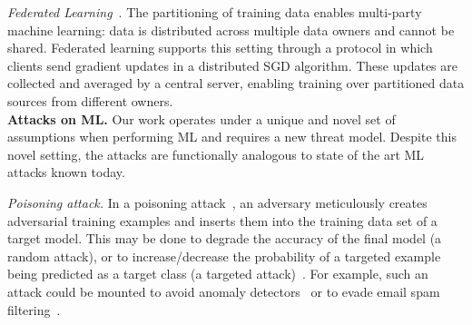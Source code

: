 
\textit{Federated Learning}~\cite{McMahan:2017}. The partitioning of
training data enables multi-party machine learning: data is
distributed across multiple data owners and cannot be shared. Federated
learning supports this setting through a protocol in which clients send
gradient updates in a distributed SGD algorithm. These updates are
collected and averaged by a central server, enabling training over
partitioned data sources from different owners. \\

\noindent \textbf{Attacks on ML.} 
%
Our work operates under a unique and novel set of assumptions when
performing ML and requires a new threat model. Despite this novel
setting, the attacks are functionally analogous to state of the art ML
attacks known today. 

\emph{Poisoning attack.}  In a poisoning attack~\cite{Biggio:2012,
Mozaffari-Kermani:2015}, an adversary meticulously creates adversarial
training examples and inserts them into the training data set of a 
target model. This may be done to degrade the accuracy of the final
model (a random attack), or to increase/decrease the probability of a
targeted example being predicted as a target class (a targeted 
attack)~\cite{Huang:2011}. For example, such an attack could be
mounted to avoid anomaly detectors~\cite{Rubinstein:2009} or to evade
email spam filtering~\cite{Nelson:2008}.  

